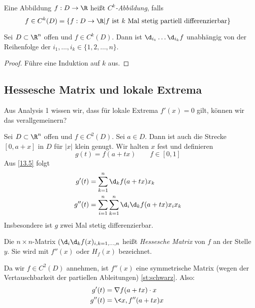 \documentclass[a4paper,10pt]{scrartcl}
\begin{document}
\begin{df}
	Eine Abbildung $f:D\to \R$ heißt \emph{$C^k$-Abbildung}, falls
	\[
		f \in C^k(D) = \{f:D\to \R|f \text{ ist $k$ Mal stetig partiell differenzierbar}\}
	\]
\end{df}

\begin{thm}
\label{st:schwarz}
Sei $D\subset \R^n$ offen und $f\in C^k(D)$. 
Dann ist $\d_{i_1}\dotsc\d_{i_k}f$ unabhängig von der Reihenfolge der $i_1,\dotsc,i_k\in\{1,2,\dotsc,n\}$.

\begin{proof}
Führe eine Induktion auf $k$ aus.
\end{proof}
\end{thm}

\setcounter{section}{13}
\setcounter{subsection}{5}
\subsection{Hessesche Matrix und lokale Extrema}

Aus Analysis 1 wissen wir, dass für lokale Extrema $f'(x)=0$ gilt, können wir das verallgemeinern?

Sei $D\subset \R^n$ offen und $f\in C^2(D)$. 
Sei $a\in D$.
Dann ist auch die Strecke $[0,a+x]$ in $D$ für $|x|$ klein genugt.
Wir halten $x$ fest und definieren
\[
g(t) = f(a+tx) \qquad f\in [0,1]
\]
Aus \ref{13.5} folgt
\begin{align*}
g'(t) &= \sum_{k=1}^n\d_kf(a+tx)x_k\\
g''(t) &= \sum_{i=1}^n\sum_{k=1}^n\d_i\d_kf(a+tx)x_ix_k
\end{align*}
Insbesondere ist $g$ zwei Mal stetig differenzierbar.

Die  $n\times n$-Matrix $(\d_i\d_kf(x)_{i,k=1,\dotsc,n}$ heißt \emph{Hessesche Matrix} von $f$ an der Stelle $y$.
Sie wird mit $f''(x)$ oder $H_f(x)$ bezeichnet.

Da wir $f\in C^2(D)$ annehmen, ist $f''(x)$ eine symmetrische Matrix (wegen der Vertauschbarkeit der partiellen Ableitungen) \ref{st:schwarz}.
Also:
\begin{align*}
g'(t) &= \nabla f(a+tx)\cdot x\\
g''(t) &= \<x,f''(a+tx)x\>
\end{align*}
\end{document}
